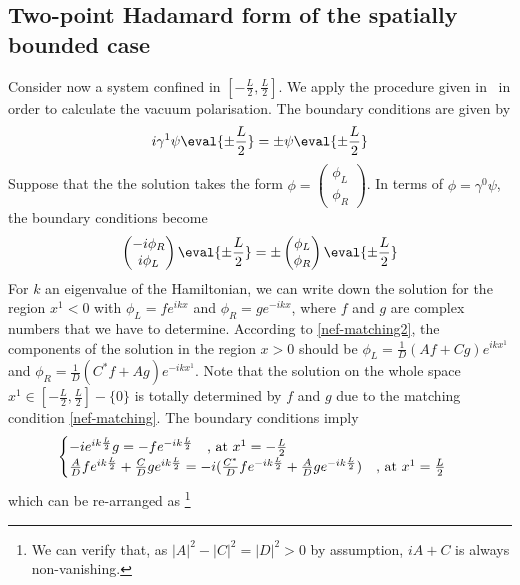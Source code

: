 \subsection{Two-point Hadamard form of the spatially bounded case}
Consider now a system confined in $[-\frac{L}{2}, \frac{L}{2}]$. We apply the procedure given in~\cite{Zahn2015} in order to calculate the vacuum polarisation. 
The boundary conditions are given by 
\begin{equation*}
i\gamma^1 \psi \eval{\pm \frac{L}{2}} = \pm \psi \eval{\pm \frac{L}{2}}
\end{equation*}
Suppose that the the solution takes the form $\phi = \begin{pmatrix} \phi_L \\ \phi_R \end{pmatrix}$.
In terms of $\phi = \gamma^0 \psi$, the boundary conditions become
\begin{equation*}
\begin{pmatrix}
-i \phi_R \\
i \phi_L
\end{pmatrix} \eval{\pm \frac{L}{2}} = \pm \begin{pmatrix}
\phi_L \\
\phi_R
\end{pmatrix} \eval{\pm \frac{L}{2}}
\end{equation*}
For $k$ an eigenvalue of the Hamiltonian, we can write down the solution for the region $x^1<0$ with $\phi_L = f e^{ikx}$ and $\phi_R = g e^{-ikx}$, where $f$ and $g$ are complex numbers that we have to determine. According to \cref{nef-matching2}, the components of the solution in the region $x > 0$ should be $\phi_L = \frac{1}{D} (Af+Cg) e^{ikx^1}$ and $\phi_R = \frac{1}{D}(C^* f + Ag ) e^{-ikx^1}$. 
Note that the solution on the whole space $x^1 \in [-\frac{L}{2}, \frac{L}{2}] - \{0\}$ is totally determined by $f$ and $g$ due to the matching condition \cref{nef-matching}. 
The boundary conditions imply
\begin{equation}
\begin{cases}
-i e^{ik \frac{L}{2}} g = -f e^{-ik \frac{L}{2}}  \quad \textrm{, at $ x^1 = -\frac{L}{2}$}  \\
\frac{A}{D} f e^{ik \frac{L}{2}} + \frac{C}{D} g e^{ik \frac{L}{2}} = -i (\frac{C^*}{D} f e^{-ik \frac{L}{2}} + \frac{A}{D} g e^{-ik \frac{L}{2}})   \quad \textrm{, at $x^1 = \frac{L}{2}$}
\end{cases}
\end{equation}
which can be re-arranged as
\footnote{We can verify that, as $|A|^2 - |C|^2 = |D|^2 > 0$ by assumption, $iA + C$ is always non-vanishing.} 
